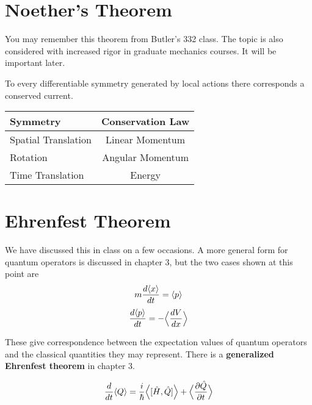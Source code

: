 \section{Noether's Theorem}
You may remember this theorem from Butler's 332 class. The topic is also considered with increased rigor in graduate mechanics courses. It will be important later.

\begin{theorem}
    To every differentiable symmetry generated by local actions there corresponds a conserved current.
\end{theorem}

\begin{center}
\begin{tabular}{lc}\label{tab:Noethers}
    Symmetry & Conservation Law \\
    \hline
    Spatial Translation & Linear Momentum \\
    Rotation            & Angular Momentum \\
    Time Translation    & Energy
\end{tabular}
\end{center}


\section{Ehrenfest Theorem}
We have discussed this in class on a few occasions. A more general form for quantum operators is discussed in chapter 3, but the two cases shown at this point are 
\begin{equation} \label{eq:ehrenfest-p}
    m \frac{d\langle x\rangle}{dt} = \langle p \rangle
\end{equation}
\begin{equation} \label{eq:ehrenfest-f}
    \frac{d\langle p \rangle}{dt} = -\Big\langle{\frac{dV}{dx}}\Big\rangle
\end{equation}

These give correspondence between the expectation values of quantum operators and the classical quantities they may represent. There is a \textbf{generalized Ehrenfest theorem} in chapter 3.

\begin{equation} \label{eq:ehrenfest-gen}
    \frac{d}{dt} \langle Q \rangle = \frac{i}{\hbar} \Big\langle{[\hat{H},\hat{Q}]}\Big\rangle + \Big\langle{\frac{\partial \hat{Q}}{\partial t}}\Big\rangle
\end{equation}